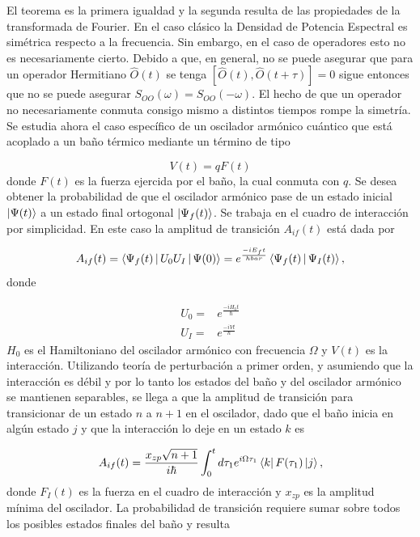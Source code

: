 \documentclass[10pt,a4paper]{report}
\begin{document}
El teorema es la primera igualdad y la segunda resulta de las propiedades de la transformada de Fourier. En el caso clásico la Densidad de Potencia Espectral es simétrica respecto a la frecuencia. Sin embargo, en el caso de operadores esto no es necesariamente cierto. Debido a que, en general, no se puede asegurar que para un operador Hermitiano $\hat{O}(t)$ se tenga $[\hat{O}(t),\hat{O}(t+\tau)] = 0$ sigue entonces que no se puede asegurar $S_{OO}(\omega) = S_{OO}(-\omega)$. El hecho de que un operador no necesariamente conmuta consigo mismo a distintos tiempos rompe la simetría. Se estudia ahora el caso específico de un oscilador armónico cuántico que está acoplado a un baño térmico mediante un término de tipo

\begin{equation}
V(t) = qF(t)
\end{equation} donde $F(t)$ es la fuerza ejercida por el baño, la cual conmuta con $q$. Se desea obtener la probabilidad de que el oscilador armónico pase de un estado inicial $\Ket{\Psi(t)}$  a un estado final ortogonal $\Ket{\Psi_f(t)}$. Se trabaja en el cuadro de interacción por simplicidad. En este caso la amplitud de transición $A_{if}(t)$ está dada por

\begin{equation}
A_{if}(t) =  \Braket{\Psi_f(t)|U_0 U_I|\Psi(0)}= e^{\frac{-i E_f t}{hbar}} \Braket{\Psi_f(t)|\Psi_I(t)} ,
\end{equation} donde

\begin{align}
U_0 =& e^{\frac{-i H_0 t}{\hbar}}\\
U_I =& e^{\frac{-i V t}{\hbar}}
\end{align} $H_0$ es el Hamiltoniano del oscilador armónico con frecuencia $\Omega$ y $V(t)$ es la interacción. Utilizando teoría de perturbación a primer orden, y asumiendo que la interacción es débil y por lo tanto los estados del baño y del oscilador armónico se mantienen separables, se llega a que la amplitud de transición para transicionar de un estado $n$ a $n+1$ en el oscilador, dado que el baño inicia en algún estado $j$ y que la interacción lo deje en un estado $k$ es

\begin{equation}
A_{if}(t) = \frac{x_{zp}\sqrt{n+1}}{i\hbar}\int_0^t d\tau_1 e^{i\Omega \tau_1} \Bra{k}F(\tau_1)\Ket{j},
\end{equation} donde $F_I(t)$ es la fuerza en el cuadro de interacción y $x_{zp}$ es la amplitud mínima del oscilador. La probabilidad de transición requiere sumar sobre todos los posibles estados finales del baño y resulta
\end{document}
